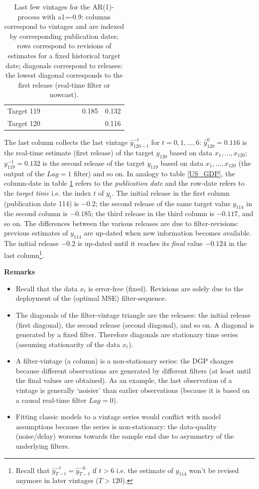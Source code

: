 \documentclass[a4paper]{book}
\begin{document}
\begin{enumerate}
\begin{table}[ht]
\begin{tabular}{rrrrrrrr}
  Target 119 &  &  &  &  &  & 0.185 & 0.132 \\ 
  Target 120 &  &  &  &  &  &  & 0.116 \\ 
   \hline
\end{tabular}
\caption{Last few vintages for the AR(1)-process with a1=-0.9: columns correspond to vintages and are indexed
  by corresponding publication dates; rows correspond to revisions of estimates for a fixed historical target date; diagonals correspond to releases: the lowest diagonal corresponds to the first release (real-time filter or nowcast).} 
\label{vintage_triangle}
\end{table}The last column collects the last vintage $\hat{y}_{120-t}^{-t}$ for $t=0,1,...,6$: $\hat{y}_{120}^{0}=0.116$
is the real-time estimate (first release) of the target $y_{120}$ based on data $x_1,...,x_{120}$; $y_{119}^{-1}=0.132$ is the second release of the target $y_{119}$ based on data $x_1,...,x_{120}$ (the output of the $Lag=1$ filter)
and so on. In analogy to table \ref{US_GDP}, the column-date in table
\ref{vintage_triangle} refers to the \emph{publication date} and the row-date refers to the
\emph{target time} i.e. the index $t$ of $y_t$. The initial release
in the first column (publication date 114) is $-0.2$;  the second release
of the same target value $y_{114}$ in the second column is $-0.185$;
the third release in the third column is $-0.117$, and so on. The differences
between the various releases are due to filter-revisions: previous estimates of  $y_{114}$ are up-dated when new information becomes available. The initial release $-0.2$ is up-dated until it reaches its \emph{final} value $-0.124$ in the last column\footnote{Recall that $\hat{y}_{T-t}^{-t}=\hat{y}_{T-t}^{-6}$ if $t>6$ i.e. the estimate of $y_{114}$ won't be revised anymore in later vintages ($T>120$).}.  
\end{enumerate}
\textbf{Remarks}
\begin{itemize}
\item Recall that the data $x_t$ is error-free (fixed). Revisions are solely due to the deployment of the (optimal MSE) filter-sequence.
\item The diagonals of the filter-vintage triangle are the releases: the initial release (first diagonal), the second release (second diagonal), and so on. A diagonal is generated by a fixed filter. Therefore diagonals are stationary time series (assuming stationarity of the data $x_t$).
\item A filter-vintage (a column) is a non-stationary series: the DGP changes because different observations are generated by different filters (at least until the final values are obtained). As an example, the last observation of a vintage is generally `noisier' than earlier observations (because it is based on a causal real-time filter $Lag=0$).
\item Fitting classic models to a vintage series would conflict with model assumptions because the series is non-stationary: the data-quality (noise/delay) worsens towards the sample end due to asymmetry of the underlying filters.
\end{itemize}
\end{document}
